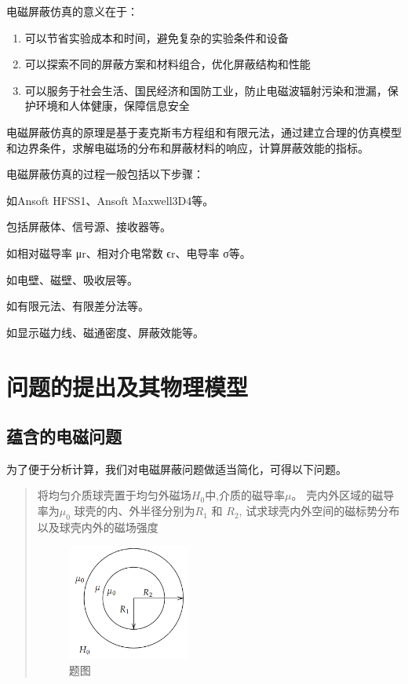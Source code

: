 \documentclass{article}
\begin{document}
电磁屏蔽仿真的意义在于：
\begin{enumerate}[label=$\vardiamondsuit$,nosep]%
    \item 可以节省实验成本和时间，避免复杂的实验条件和设备
    \item 可以探索不同的屏蔽方案和材料组合，优化屏蔽结构和性能
    \item 可以服务于社会生活、国民经济和国防工业，防止电磁波辐射污染和泄漏，保护环境和人体健康，保障信息安全
\end{enumerate}

电磁屏蔽仿真的原理是基于麦克斯韦方程组和有限元法，通过建立合理的仿真模型和边界条件，求解电磁场的分布和屏蔽材料的响应，计算屏蔽效能的指标。

电磁屏蔽仿真的过程一般包括以下步骤：
\begin{description}[leftmargin=4.7cm,style=nextline,nosep]%
\item[选择合适的仿真软件和模块]如Ansoft HFSS1、Ansoft Maxwell3D4等。
\item[建立仿真模型]包括屏蔽体、信号源、接收器等。
\item[定义材料属性]如相对磁导率 μr​、相对介电常数 ϵr​、电导率 σ等。
\item[设置边界条件]如电壁、磁壁、吸收层等。
\item[进行网格划分和求解器选择]如有限元法、有限差分法等。
\item[后处理分析]如显示磁力线、磁通密度、屏蔽效能等。 
\end{description}

\section{问题的提出及其物理模型}
\subsection{蕴含的电磁问题}
为了便于分析计算，我们对电磁屏蔽问题做适当简化，可得以下问题。
\begin{quote}
{\qquad{}\ccwd\kaishu{}
将均匀介质球壳置于均匀外磁场$ H_{0} $中,介质的磁导率$ \mu$。
壳内外区域的磁导率为$ \mu_{0} $ 球壳的内、外半径分别为$ R_{1} $ 和 $ R_{2}$,
试求球壳内外空间的磁标势分布以及球壳内外的磁场强度
        \begin{figure}[H]
            \centering
            \includegraphics[width=4cm]{img/2.png}
            \caption{题图}
            \end{figure}
}
\end{quote}
\end{document}
